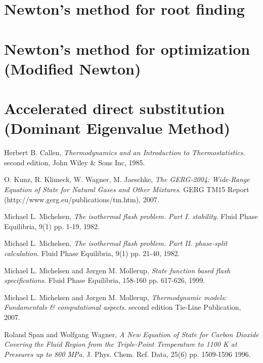 \documentclass[internal,english]{sintefmemo2012}
\begin{document}
\appendix

\section{Newton's method for root finding}
\section{Newton's method for optimization (Modified Newton)}
\section{Accelerated direct substitution (Dominant Eigenvalue Method)}


\begin{thebibliography}{9}

  Herbert B. Callen,
  \emph{Thermodynamics and an Introduction to Thermostatistics}.
  second edition,
  John Wiley \& Sons Inc,
  1985.

  O. Kunz, R. Klimeck, W. Wagner, M. Jaeschke,
  \emph{The GERG-2004: Wide-Range Equation of State for Natural Gases and Other Mixtures}.
  GERG TM15 Report (http://www.gerg.eu/publications/tm.htm),
  2007.

  Michael L. Michelsen,
  \emph{The isothermal flash problem. Part I. stability}.
  Fluid Phase Equilibria,
  9(1)
  pp. 1-19,
  1982.

  Michael L. Michelsen,
  \emph{The isothermal flash problem. Part II. phase-split calculation}.
  Fluid Phase Equilibria,
  9(1)
  pp. 21-40,
  1982.

  Michael L. Michelsen and J{\o}rgen M. Mollerup,
  \emph{State function based flash specifications}.
  Fluid Phase Equilibria,
  158-160
  pp. 617-626,
  1999.

  Michael L. Michelsen and J{\o}rgen M. Mollerup,
  \emph{Thermodynamic models: Fundamentals \& computational aspects}.
  second edition
  Tie-Line Publication,
  2007.

  Roland Span and Wolfgang Wagner,
  \emph{A New Equation of State for Carbon Dioxide Covering the Fluid Region
  from the Triple-Point Temperature to 1100 {K} at Pressures up to 800 {MPa}}.
  J. Phys. Chem. Ref. Data,
  25(6)
  pp. 1509-1596
  1996.

\end{thebibliography}
\end{document}
